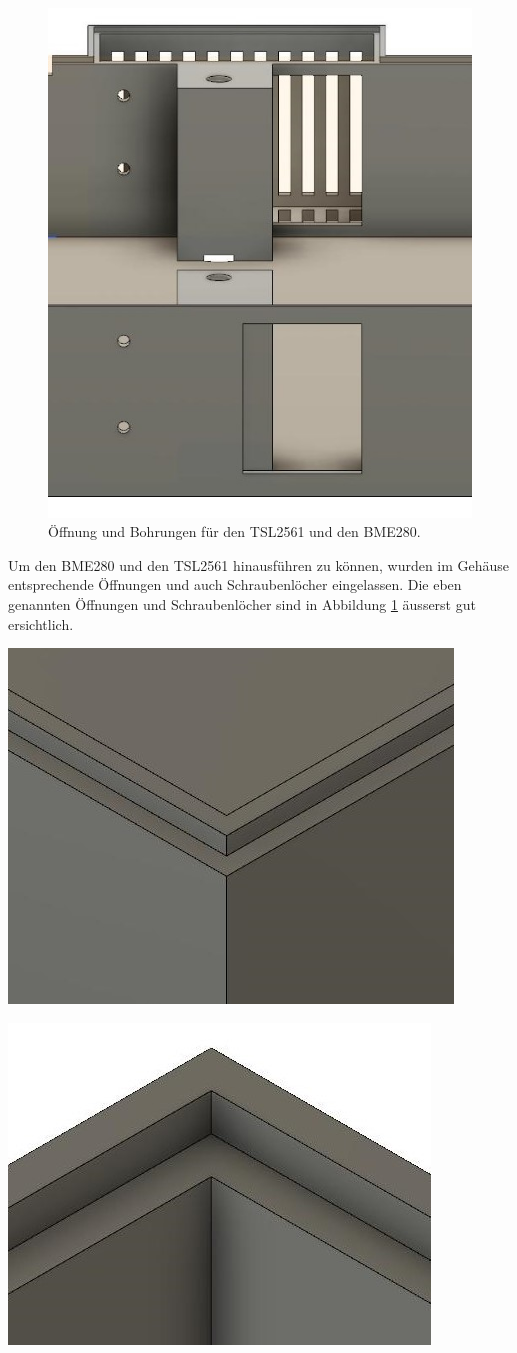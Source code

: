 {\begin{figure}[h]
\centering
\includegraphics[width=0.5\linewidth]{graphics/Gehaeuse/Design_Deckel_TSL.jpg}
\caption{Öffnung und Bohrungen für den TSL2561 und den BME280.}
\label{fig:D:Deckel:TSL}
\end{figure}
Um den BME280 und den TSL2561 hinausführen zu können, wurden im Gehäuse entsprechende Öffnungen und auch Schraubenlöcher eingelassen. Die eben genannten Öffnungen und Schraubenlöcher sind in Abbildung \ref{fig:D:Deckel:TSL} äusserst gut ersichtlich.
\newpage
{\begin{minipage}[b][6cm][t]{0.49\textwidth}
\centering
\includegraphics[width=0.8\linewidth]{graphics/Gehaeuse/Design_Boden_Rand.jpg}
\label{fig:D:Boden:Rand}
\end{minipage}}
{\begin{minipage}[b][6cm][t]{0.49\textwidth}
\centering
\includegraphics[width=0.8\linewidth]{graphics/Gehaeuse/Design_Deckel_Rand.jpg}

\end{minipage}}}
